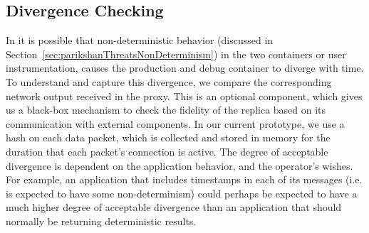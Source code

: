 
\subsection{Divergence Checking}
\label{sec:parikshanDivergenceChecking}

In \parikshan it is possible that non-deterministic behavior (discussed in Section~\ref{sec:parikshanThreatsNonDeterminism}) in the two containers or user instrumentation, causes the production and debug container to diverge with time.
To understand and capture this divergence, we compare the corresponding network output received in the proxy.
This is an optional component, which gives us a black-box mechanism to check the fidelity of the replica based on its communication with external components.
In our current prototype, we use a hash on each data packet, which is collected and stored in memory for the duration that each packet's connection is active.
The degree of acceptable divergence is dependent on the application behavior, and the operator's wishes. 
For example, an application that includes timestamps in each of its messages (i.e. is expected to have some non-determinism) could perhaps be expected to have a much higher degree of acceptable divergence than an application that should normally be returning deterministic results.
